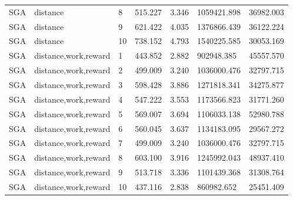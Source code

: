 \documentclass{tamuccthesis}
\begin{document}
\begin{appendices}
\begin{small}
\begin{longtable}{lllllll}
SGA & distance    & 8   & 515.227 & 3.346 & 1059421.898 & 36982.003 \\
SGA & distance    & 9   & 621.422 & 4.035 & 1376866.439 & 36122.224 \\
SGA & distance    & 10  & 738.152 & 4.793 & 1540225.585 & 30053.169  \\
SGA & distance,work,reward    & 1   & 443.852 & 2.882 &  902948.385 & 45557.570 \\
SGA & distance,work,reward    & 2   & 499.009 & 3.240 & 1036000.476 & 32797.715 \\
SGA & distance,work,reward    & 3   & 598.428 & 3.886 & 1271818.341 & 34275.877 \\
SGA & distance,work,reward    & 4   & 547.222 & 3.553 & 1173566.823 & 31771.260 \\
SGA & distance,work,reward    & 5   & 569.007 & 3.694 & 1106033.138 & 52980.788 \\
SGA & distance,work,reward    & 6   & 560.045 & 3.637 & 1134183.095 & 29567.272 \\
SGA & distance,work,reward    & 7   & 499.009 & 3.240 & 1036000.476 & 32797.715 \\
SGA & distance,work,reward    & 8   & 603.100 & 3.916 & 1245992.043 & 48937.410 \\
SGA & distance,work,reward    & 9   & 513.718 & 3.336 & 1101439.368 & 31308.764 \\
SGA & distance,work,reward    & 10  & 437.116 & 2.838 &  860982.652 & 25451.409
\end{longtable}
\end{small}


\end{appendices}
\end{document}
